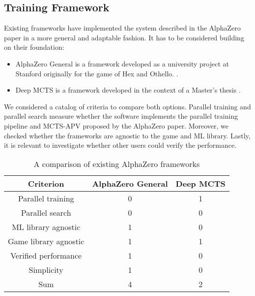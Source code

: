 \subsection{Training Framework}
\label{training_framework}
Existing frameworks have implemented the system described in the AlphaZero paper in a more general and adaptable fashion. It has to be considered building on their foundation:

\begin{itemize}
    \item AlphaZero General is a framework developed as a university project at Stanford originally for the game of Hex and Othello. \cite{thakoor_learning_nodate,thakoor_suragnairalpha-zero-general_nodate}.
    \item Deep MCTS is a framework developed in the context of a Master's thesis \cite{bruasdal_deep_2020,henribru_deep_2021}.
\end{itemize}

We considered a catalog of criteria to compare both options. Parallel training and parallel search measure whether the software implements the parallel training pipeline and MCTS-APV proposed by the AlphaZero paper. Moreover, we checked whether the frameworks are agnostic to the game and ML library. Lastly, it is relevant to investigate whether other users could verify the performance.

\begin{table*}
    \begin{center}
        \begin{tabular}{ c|c|c }
            Criterion             & AlphaZero General & Deep MCTS \\
            \hline
            \hline
            Parallel training     & 0                 & 1         \\
            Parallel search       & 0                 & 0         \\
            ML library agnostic   & 1                 & 0         \\
            Game library agnostic & 1                 & 1         \\
            Verified performance  & 1                 & 0         \\
            Simplicity            & 1                 & 0         \\
            \hline
            \hline
            Sum                   & 4                 & 2         \\
        \end{tabular}
    \end{center}
    \caption{A comparison of existing AlphaZero frameworks}\label{training_framework_comparison}
\end{table*}

